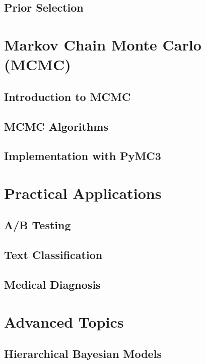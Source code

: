 \documentclass[
  letterpaper,
  paper=6in:9in,pagesize=pdftex,footinclude=on,11pt]{scrreprt}
\begin{document}
\chapter{Prior Selection}\label{prior-selection}

\part{Markov Chain Monte Carlo (MCMC)}

\chapter{Introduction to MCMC}\label{introduction-to-mcmc}

\chapter{MCMC Algorithms}\label{mcmc-algorithms}

\chapter{Implementation with PyMC3}\label{implementation-with-pymc3}

\part{Practical Applications}

\chapter{A/B Testing}\label{ab-testing}

\chapter{Text Classification}\label{text-classification}

\chapter{Medical Diagnosis}\label{medical-diagnosis}

\part{Advanced Topics}

\chapter{Hierarchical Bayesian
Models}\label{hierarchical-bayesian-models}
\end{document}
